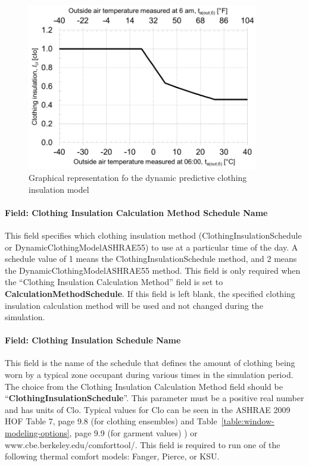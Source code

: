 \begin{figure}[hbtp] %
\centering
\includegraphics[width=0.9\textwidth, height=0.9\textheight, keepaspectratio=true]{media/image083.png}
\caption{Graphical representation fo the dynamic predictive clothing insulation model \protect \label{fig:graphical-representation-fo-the-dynamic}}
\end{figure}

\paragraph{Field: Clothing Insulation Calculation Method Schedule Name}\label{field-clothing-insulation-calculation-method-schedule-name}

This field specifies which clothing insulation method (ClothingInsulationSchedule or DynamicClothingModelASHRAE55) to use at a particular time of the day. A schedule value of 1 means the ClothingInsulationSchedule method, and 2 means the DynamicClothingModelASHRAE55 method. This field is only required when the ``Clothing Insulation Calculation Method'' field is set to \textbf{CalculationMethodSchedule}. If this field is left blank, the specified clothing insulation calculation method will be used and not changed during the simulation.

\paragraph{Field: Clothing Insulation Schedule Name}\label{field-clothing-insulation-schedule-name}

This field is the name of the schedule that defines the amount of clothing being worn by a typical zone occupant during various times in the simulation period. The choice from the Clothing Insulation Calculation Method field should be ``\textbf{ClothingInsulationSchedule}''. This parameter must be a positive real number and has units of Clo. Typical values for Clo can be seen in the ASHRAE 2009 HOF Table 7, page 9.8 (for clothing ensembles) and Table~\ref{table:window-modeling-options}, page 9.9 (for garment values) ) or www.cbe.berkeley.edu/comforttool/. This field is required to run one of the following thermal comfort models: Fanger, Pierce, or KSU.

